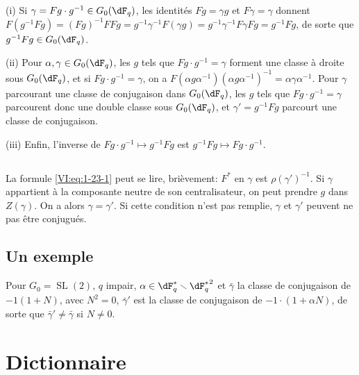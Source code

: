 \documentclass[oneside]{book}
\renewcommand{\setminus}{\smallsetminus}
\theoremstyle{sga-source}
\theoremstyle{sga-source-dash}
\theoremstyle{sga-source-dotdash}
\theoremstyle{sga-source-number-note-dash}
\theoremstyle{sga-source-note-number-dotdash}
\theoremstyle{sga-source-example-dotdash}
\theoremstyle{sga-source-inline-number}
\theoremstyle{sga-source-bare-number}
\theoremstyle{sga-source}
\newcommand{\PrintPage}[1]{}\newcommand{\MathPage}[1]{}\newcommand{\PrintCite}[2]{#1}\newcommand{\var}[3]{#1}
\begin{document}
\PrintPage{182}
(i) Si $\gamma= F g\cdot g^{-1}\in G_0(\dF_q)$, les identités $F g=\gamma g$ 
et 
$F\gamma=\gamma$ donnent $F(g^{-1} F g) = (F g)^{-1} F F g = g^{-1} \gamma^{-1} F(\gamma g) = g^{-1} \gamma^{-1} F \gamma F g = g^{-1} F g$, 
de sorte que $g^{-1} F g \in G_0(\dF_q)$. 

(ii) Pour $\alpha,\gamma\in G_0(\dF_q)$, les $g$ tels que 
$F g\cdot g^{-1} = \gamma$ forment une classe à droite sous $G_0(\dF_q)$, et 
si $F g\cdot g^{-1} = \gamma$, on a 
$F(\alpha g \alpha^{-1})(\alpha g \alpha^{-1})^{-1} = \alpha \gamma\alpha^{-1}$. 
Pour $\gamma$ parcourant une classe de conjugaison dans $G_0(\dF_q)$, les $g$ 
tels que $F g\cdot g^{-1} = \gamma$ parcourent donc une double classe sous 
$G_0(\dF_q)$, et $\gamma'= g^{-1} F g$ parcourt une classe de conjugaison. 

(iii) Enfin, l'inverse de $F g\cdot g^{-1}\mapsto g^{-1} F g$ est 
$g^{-1} F g\mapsto F g\cdot g^{-1}$. 





\subsection{}\label{VI:1-25}

La formule \eqref{VI:eq:1-23-1} peut se lire, brièvement: $F^\ast$ en 
$\gamma$ est $\rho(\gamma')^{-1}$. Si $\gamma$ appartient à la composante 
neutre de son centralisateur, on peut prendre $g$ dans $Z(\gamma)$. On a alors 
$\gamma=\gamma'$. Si cette condition n'est pas remplie, $\gamma$ et $\gamma'$ 
peuvent ne pas être conjugués. 





\subsection{Un exemple}\label{VI:1-26}

Pour $G_0=\operatorname{SL}(2)$, $q$ impair, 
$\alpha\in \dF_q^\ast\setminus {\dF_q^\ast}^2$ et $\bar\gamma$ la classe de 
conjugaison de $-1(1+N)$, avec $N^2=0$, $\bar\gamma'$ est la classe de 
conjugaison de $-1\cdot (1+\alpha N)$, de sorte que $\bar\gamma'\ne \bar\gamma$ 
si $N\ne 0$. 










\PrintPage{183}
\section{Dictionnaire}\label{VI:2}
\end{document}
